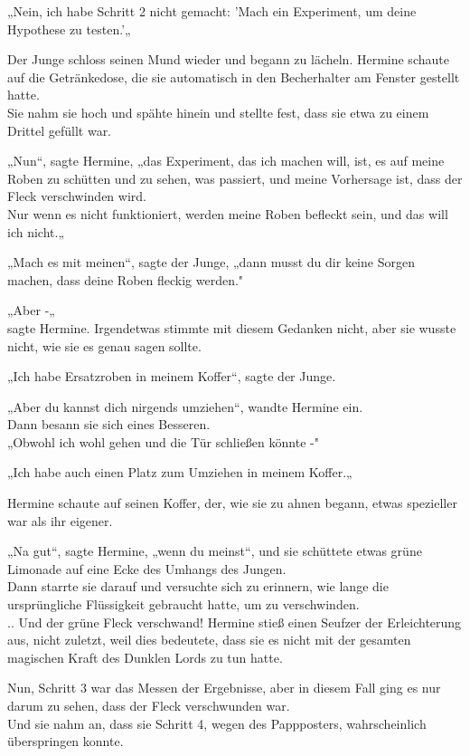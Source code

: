 {„Nein, ich habe Schritt 2 nicht gemacht: 'Mach ein Experiment, um deine Hypothese zu testen.'„

Der Junge schloss seinen Mund wieder und begann zu lächeln. Hermine schaute auf die Getränkedose, die sie automatisch in den Becherhalter am Fenster gestellt hatte.\\ Sie nahm sie hoch und spähte hinein und stellte fest, dass sie etwa zu einem Drittel gefüllt war.

„Nun“, sagte Hermine, „das Experiment, das ich machen will, ist, es auf meine Roben zu schütten und zu sehen, was passiert, und meine Vorhersage ist, dass der Fleck verschwinden wird.\\ Nur wenn es nicht funktioniert, werden meine Roben befleckt sein, und das will ich nicht.„

„Mach es mit meinen“, sagte der Junge, „dann musst du dir keine Sorgen machen, dass deine Roben fleckig werden."

„Aber -„\\ sagte Hermine. Irgendetwas stimmte mit diesem Gedanken nicht, aber sie wusste nicht, wie sie es genau sagen sollte.

„Ich habe Ersatzroben in meinem Koffer“, sagte der Junge.

„Aber du kannst dich nirgends umziehen“, wandte Hermine ein.\\ Dann besann sie sich eines Besseren.\\ „Obwohl ich wohl gehen und die Tür schließen könnte -"

„Ich habe auch einen Platz zum Umziehen in meinem Koffer.„

Hermine schaute auf seinen Koffer, der, wie sie zu ahnen begann, etwas spezieller war als ihr eigener.

„Na gut“, sagte Hermine, „wenn du meinst“, und sie schüttete etwas grüne Limonade auf eine Ecke des Umhangs des Jungen.\\ Dann starrte sie darauf und versuchte sich zu erinnern, wie lange die ursprüngliche Flüssigkeit gebraucht hatte, um zu verschwinden.\\ .. Und der grüne Fleck verschwand! Hermine stieß einen Seufzer der Erleichterung aus, nicht zuletzt, weil dies bedeutete, dass sie es nicht mit der gesamten magischen Kraft des Dunklen Lords zu tun hatte.

Nun, Schritt 3 war das Messen der Ergebnisse, aber in diesem Fall ging es nur darum zu sehen, dass der Fleck verschwunden war.\\ Und sie nahm an, dass sie Schritt 4, wegen des Pappposters, wahrscheinlich überspringen konnte.

}

